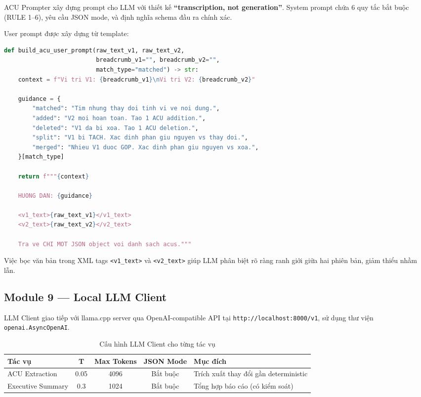 ACU Prompter xây dựng prompt cho LLM với thiết kế \textbf{``transcription, not generation''}. System prompt chứa 6 quy tắc bắt buộc (RULE 1--6), yêu cầu JSON mode, và định nghĩa schema đầu ra chính xác.

User prompt được xây dựng từ template:

\begin{lstlisting}[language=Python, caption={Xây dựng ACU user prompt với context và guidance}, label={lst:acu_prompt}]
def build_acu_user_prompt(raw_text_v1, raw_text_v2,
                          breadcrumb_v1="", breadcrumb_v2="",
                          match_type="matched") -> str:
    context = f"Vi tri V1: {breadcrumb_v1}\nVi tri V2: {breadcrumb_v2}"

    guidance = {
        "matched": "Tim nhung thay doi tinh vi ve noi dung.",
        "added": "V2 moi hoan toan. Tao 1 ACU addition.",
        "deleted": "V1 da bi xoa. Tao 1 ACU deletion.",
        "split": "V1 bi TACH. Xac dinh phan giu nguyen vs thay doi.",
        "merged": "Nhieu V1 duoc GOP. Xac dinh phan giu nguyen vs xoa.",
    }[match_type]

    return f"""{context}

    HUONG DAN: {guidance}

    <v1_text>{raw_text_v1}</v1_text>
    <v2_text>{raw_text_v2}</v2_text>

    Tra ve CHI MOT JSON object voi danh sach acus."""
\end{lstlisting}

Việc bọc văn bản trong XML tags \texttt{<v1\_text>} và \texttt{<v2\_text>} giúp LLM phân biệt rõ ràng ranh giới giữa hai phiên bản, giảm thiểu nhầm lẫn.

\subsection{Module 9 — Local LLM Client}

LLM Client giao tiếp với llama.cpp server \cite{llamacpp2024} qua OpenAI-compatible API tại \texttt{http://localhost:8000/v1}, sử dụng thư viện \texttt{openai.AsyncOpenAI}.

\begin{table}[H]
    \centering
    \caption{Cấu hình LLM Client cho từng tác vụ}
    \label{tab:llm_config}
    \begin{tabularx}{\textwidth}{X c c c X}
        \toprule
        \textbf{Tác vụ} & \textbf{T} & \textbf{Max Tokens} & \textbf{JSON Mode} & \textbf{Mục đích}\\
        \midrule
        ACU Extraction & 0.05 & 4096 & Bắt buộc & Trích xuất thay đổi gần deterministic\\
        Executive Summary & 0.3 & 1024 & Bắt buộc & Tổng hợp báo cáo (có kiểm soát)\\
        \bottomrule
    \end{tabularx}
\end{table}

